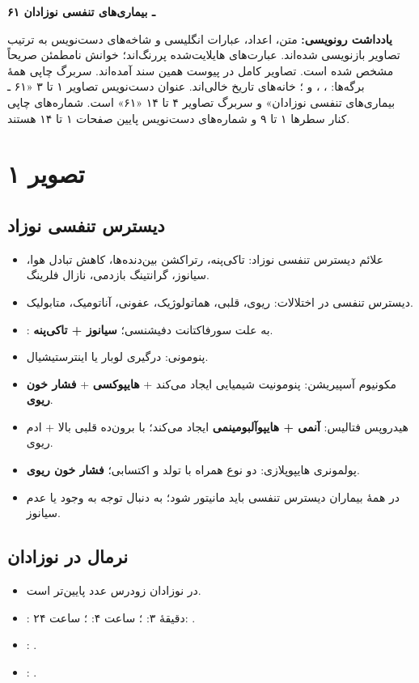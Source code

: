 \documentclass[12pt,a4paper]{article}
\begin{document}
\fi
\providecommand{\NRmark}[1]{\textbf{#1}}
\providecommand{\NRunclear}[1]{\textbf{[خوانش نامطمئن: #1]}}
\providecommand{\NRmath}[1]{\lr{\(#1\)}}
\providecommand{\NRpage}[1]{\clearpage\section*{تصویر #1}}

\begin{center}
{\Large\bfseries ۶۱ ـ بیماری‌های تنفسی نوزادان}\par
{}
\end{center}
\textbf{یادداشت رونویسی:}
متن، اعداد، عبارات انگلیسی و شاخه‌های دست‌نویس به ترتیب تصاویر بازنویسی شده‌اند.
عبارت‌های هایلایت‌شده پررنگ‌اند؛ خوانش نامطمئن صریحاً مشخص شده است.
تصاویر کامل در پیوست همین سند آمده‌اند.
سربرگ چاپی همهٔ برگه‌ها: ، ،  و ؛
خانه‌های تاریخ خالی‌اند. عنوان دست‌نویس تصاویر ۱ تا ۳ «۶۱ ـ بیماری‌های تنفسی نوزادان»
و سربرگ تصاویر ۴ تا ۱۴ «۶۱» است.
شماره‌های چاپی کنار سطرها ۱ تا ۹ و شماره‌های دست‌نویس پایین صفحات ۱ تا ۱۴ هستند.

\NRpage{۱}
\subsection*{دیسترس تنفسی نوزاد}
\begin{itemize}
\item علائم دیسترس تنفسی نوزاد: تاکی‌پنه، رتراکشن بین‌دنده‌ها، کاهش تبادل هوا، سیانوز، گرانتینگ بازدمی، نازال فلرینگ.
\item دیسترس تنفسی در اختلالات: ریوی، قلبی، هماتولوژیک، عفونی، آناتومیک، متابولیک.
\item {}: به علت سورفاکتانت دفیشنسی؛ \NRmark{سیانوز + تاکی‌پنه}.
\item پنومونی: درگیری لوبار یا اینترستیشیال.
\item مکونیوم آسپیریشن: پنومونیت شیمیایی ایجاد می‌کند + \NRmark{هایپوکسی} + \NRmark{فشار خون ریوی}.
\item هیدروپس فتالیس: \NRmark{آنمی + هایپوآلبومینمی} ایجاد می‌کند؛  با برون‌ده قلبی بالا + ادم ریوی.
\item پولمونری هایپوپلازی: دو نوع همراه با تولد و اکتسابی؛ \NRmark{فشار خون ریوی}.
\item در همهٔ بیماران دیسترس تنفسی \NRmark{} باید مانیتور شود؛ به دنبال توجه به وجود یا عدم سیانوز.
\end{itemize}
\subsection*{ نرمال در نوزادان}
\begin{itemize}
\item در نوزادان زودرس عدد پایین‌تر است.
\item \NRmath{PaO_2}: دقیقهٔ ۳: ؛ ساعت ۴: ؛ ساعت ۲۴: .
\item \NRmath{PaCO_2}: .
\item {}: .
\end{itemize}
\end{document}

